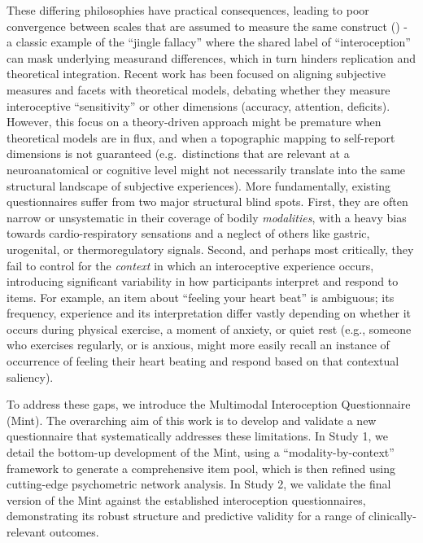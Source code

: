 \documentclass[
  jou,
  floatsintext,
  longtable,
  nolmodern,
  notxfonts,
  notimes,
  colorlinks=true,linkcolor=blue,citecolor=blue,urlcolor=blue]{apa7}
\begin{document}
These differing philosophies have practical consequences, leading to
poor convergence between scales that are assumed to measure the same
construct () - a
classic example of the ``jingle fallacy'' where the shared label of
``interoception'' can mask underlying measurand differences, which in
turn hinders replication and theoretical integration. Recent work has
been focused on aligning subjective measures and facets with theoretical
models, debating whether they measure interoceptive ``sensitivity'' or
other dimensions (accuracy, attention, deficits). However, this focus on
a theory-driven approach might be premature when theoretical models are
in flux, and when a topographic mapping to self-report dimensions is not
guaranteed (e.g.~distinctions that are relevant at a neuroanatomical or
cognitive level might not necessarily translate into the same structural
landscape of subjective experiences). More fundamentally, existing
questionnaires suffer from two major structural blind spots. First, they
are often narrow or unsystematic in their coverage of bodily
\emph{modalities}, with a heavy bias towards cardio-respiratory
sensations and a neglect of others like gastric, urogenital, or
thermoregulatory signals. Second, and perhaps most critically, they fail
to control for the \emph{context} in which an interoceptive experience
occurs, introducing significant variability in how participants
interpret and respond to items. For example, an item about ``feeling
your heart beat'' is ambiguous; its frequency, experience and its
interpretation differ vastly depending on whether it occurs during
physical exercise, a moment of anxiety, or quiet rest (e.g., someone who
exercises regularly, or is anxious, might more easily recall an instance
of occurrence of feeling their heart beating and respond based on that
contextual saliency).

To address these gaps, we introduce the Multimodal Interoception
Questionnaire (Mint). The overarching aim of this work is to develop and
validate a new questionnaire that systematically addresses these
limitations. In Study 1, we detail the bottom-up development of the
Mint, using a ``modality-by-context'' framework to generate a
comprehensive item pool, which is then refined using cutting-edge
psychometric network analysis. In Study 2, we validate the final version
of the Mint against the established interoception questionnaires,
demonstrating its robust structure and predictive validity for a range
of clinically-relevant outcomes.
\end{document}
